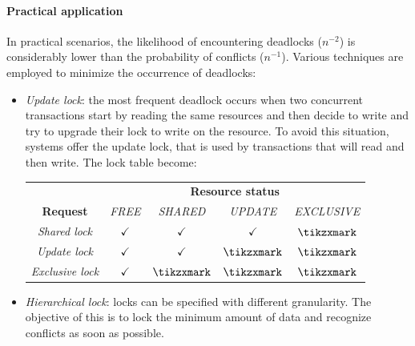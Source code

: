 \paragraph*{Practical application}
In practical scenarios, the likelihood of encountering deadlocks ($n^{-2}$) is considerably lower than the probability of conflicts ($n^{-1}$).
Various techniques are employed to minimize the occurrence of deadlocks:
\begin{itemize}
    \item \textit{Update lock}: the most frequent deadlock occurs when two concurrent transactions start by reading the same resources and then decide to write and try to upgrade their lock to write on the resource. 
    To avoid this situation, systems offer the update lock, that is used by transactions that will read and then write. 
    The lock table become: 
    \begin{table}[H]
        \centering
        \begin{tabular}{ccccc}
        \textbf{}                                     & \multicolumn{4}{c}{\textbf{Resource status}}                                                                                                        \\ \cline{2-5} 
        \multicolumn{1}{c|}{\textbf{Request}}         & \textit{FREE}                     & \textit{SHARED}                   & \textit{UPDATE}                   & \multicolumn{1}{c|}{\textit{EXCLUSIVE}} \\ \hline
        \multicolumn{1}{|c|}{\textit{Shared lock}}    & \multicolumn{1}{c}{$\checkmark$} & \multicolumn{1}{c}{$\checkmark$} & \multicolumn{1}{c}{$\checkmark$} & \multicolumn{1}{c|}{$\tikzxmark$}       \\ 
        \multicolumn{1}{|c|}{\textit{Update lock}}    & \multicolumn{1}{c}{$\checkmark$} & \multicolumn{1}{c}{$\checkmark$} & \multicolumn{1}{c}{$\tikzxmark$} & \multicolumn{1}{c|}{$\tikzxmark$}       \\ 
        \multicolumn{1}{|c|}{\textit{Exclusive lock}} & \multicolumn{1}{c}{$\checkmark$} & \multicolumn{1}{c}{$\tikzxmark$} & \multicolumn{1}{c}{$\tikzxmark$} & \multicolumn{1}{c|}{$\tikzxmark$}       \\ \hline
        \end{tabular}
    \end{table}
    \item \textit{Hierarchical lock}: locks can be specified with different granularity. 
        The objective of this is to lock the minimum amount of data and recognize conflicts as soon as possible.

\end{itemize}
